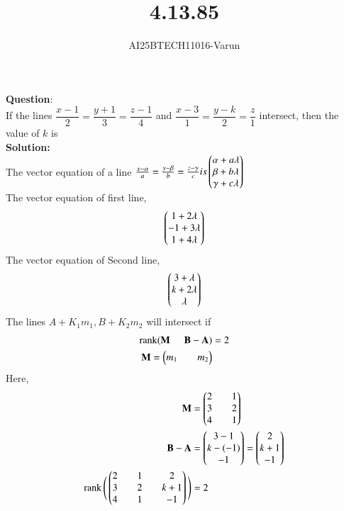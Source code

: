 \documentclass[journal]{IEEEtran}
\begin{document}

\vspace{3cm}

\title{4.13.85}
\author{AI25BTECH11016-Varun}
 \maketitle
{\let\newpage\relax\maketitle}
\renewcommand{\thefigure}{\theenumi}
\renewcommand{\thetable}{\theenumi}
\setlength{\intextsep}{10pt} %

\renewcommand{\thetable}{\theenumi}
\textbf{Question}:\\
If the lines $\dfrac{x-1}{2} = \dfrac{y+1}{3} = \dfrac{z-1}{4}$ 
and $\dfrac{x-3}{1} = \dfrac{y-k}{2} = \dfrac{z}{1}$ intersect, 
then the value of $k$ is\\
\textbf{Solution:}\\
The vector equation of a line $\tfrac{x-\alpha}{a}=\tfrac{y-\beta}{b}=\tfrac{z-\gamma}{c}  is \begin{pmatrix}\alpha+a\lambda\\\beta+b\lambda\\\gamma+c\lambda\end{pmatrix}$\\
The vector equation of first line,
\begin{align}
\begin{pmatrix}1+2\lambda\\-1+3\lambda\\1+4\lambda\end{pmatrix}
\end{align}
The vector equation of Second line,
\begin{align}
\begin{pmatrix}3+\lambda\\k+2\lambda\\\lambda\end{pmatrix}
\end{align}
The lines $A+ K_1m_1,B+K_2m_2$ will intersect if 
\begin{align}
\operatorname{rank}(\mathbf{M} \hspace{5mm}  \mathbf{B-A})&=2\\
\mathbf{M}=\begin{pmatrix}m_1&&m_2\end{pmatrix}
\end{align}
Here,
\begin{align}
\mathbf{M}&=\begin{pmatrix}2&&1\\3&&2\\4&&1\end{pmatrix}\\
\mathbf{B-A}&=\begin{pmatrix}3-1\\k-(-1)\\-1\end{pmatrix}=\begin{pmatrix}2\\k+1\\-1\end{pmatrix}\\
\operatorname{rank}\Bigg(\begin{pmatrix}2&&1&&2\\3&&2&&k+1\\4&&1&&-1\end{pmatrix}\Bigg)&=2
\end{align}
\end{document}
